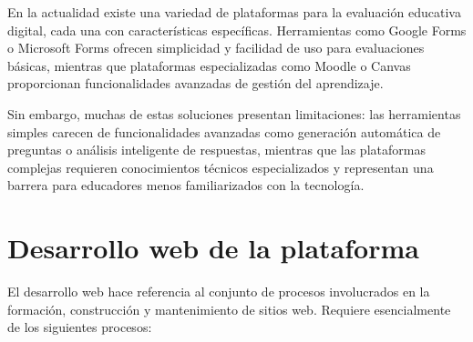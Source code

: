 \documentclass[12pt,a4paper]{report}
\begin{document}
En la actualidad existe una variedad de plataformas para la evaluación educativa digital, cada una con características específicas. Herramientas como Google Forms o Microsoft Forms ofrecen simplicidad y facilidad de uso para evaluaciones básicas, mientras que plataformas especializadas como Moodle o Canvas proporcionan funcionalidades avanzadas de gestión del aprendizaje.

Sin embargo, muchas de estas soluciones presentan limitaciones: las herramientas simples carecen de funcionalidades avanzadas como generación automática de preguntas o análisis inteligente de respuestas, mientras que las plataformas complejas requieren conocimientos técnicos especializados y representan una barrera para educadores menos familiarizados con la tecnología.

\section{Desarrollo web de la plataforma}

El desarrollo web hace referencia al conjunto de procesos involucrados en la formación, construcción y mantenimiento de sitios web. Requiere esencialmente de los siguientes procesos:
\end{document}
